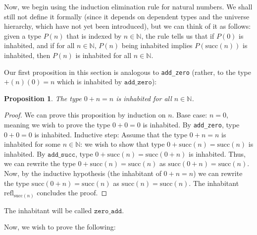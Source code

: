 \documentclass[12pt]{article}
\newtheorem{proposition}{Proposition}[section]
\theoremstyle{definition}
\theoremstyle{remark}
\begin{document}
Now, we begin using the induction elimination rule for natural numbers. We shall still not define it formally (since it depends on dependent types and the universe hierarchy, which have not yet been introduced), but we can think of it as follows: given a type $P(n)$ that is indexed by $n \in \mathbb{N}$, the rule tells us that if $P(0)$ is inhabited, and if for all $n \in \mathbb{N}$, $P(n)$ being inhabited implies $P(\text{succ}(n))$ is inhabited, then $P(n)$ is inhabited for all $n \in \mathbb{N}$. 

Our first proposition in this section is analogous to \texttt{add\_zero} (rather, to the type $+(n)(0) = n$ which is inhabited by $\texttt{add\_zero}$):

\begin{proposition}
  The type $0 + n = n$ is inhabited for all $n \in \mathbb{N}$.
\end{proposition}
\begin{proof}
  We can prove this proposition by induction on $n$. Base case: $n = 0$, meaning we wish to prove the type $0 + 0 = 0$ is inhabited. By \texttt{add\_zero}, type $0 + 0 = 0$ is inhabited. Inductive step: Assume that the type $0 + n = n$ is inhabited for some $n \in \mathbb{N}$: we wish to show that type $0 + \text{succ}(n) = \text{succ}(n)$ is inhabited. By $\texttt{add\_succ}$, type $0 + \text{succ}(n) = \text{succ}(0 + n)$ is inhabited. Thus, we can rewrite the type $0 + \text{succ}(n) = \text{succ}(n)$ as $\text{succ}(0 + n) = \text{succ}(n)$. Now, by the inductive hypothesis (the inhabitant of $0 + n = n$) we can rewrite the type $\text{succ}(0 + n) = \text{succ}(n)$ as $\text{succ}(n) = \text{succ}(n)$.
  The inhabitant $\text{refl}_{\text{succ}(n)}$ concludes the proof.
\end{proof}

The inhabitant will be called $\texttt{zero\_add}$.

Now, we wish to prove the following:
\end{document}
